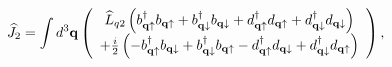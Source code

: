\begin{equation}
\widehat{J}_{2}=\int d^{3}\mathbf{q}\left( 
\begin{array}{c}
\widehat{L}_{q2}\left( b_{\mathbf{q}\uparrow }^{\dagger }b_{\mathbf{q}%
\uparrow }+b_{\mathbf{q}\downarrow }^{\dagger }b_{\mathbf{q}\downarrow }+d_{%
\mathbf{q}\uparrow }^{\dagger }d_{\mathbf{q}\uparrow }+d_{\mathbf{q}%
\downarrow }^{\dagger }d_{\mathbf{q}\downarrow }\right) \\ 
+\frac{i}{2}\left( -b_{\mathbf{q}\uparrow }^{\dagger }b_{\mathbf{q}%
\downarrow }+b_{\mathbf{q}\downarrow }^{\dagger }b_{\mathbf{q}\uparrow }-d_{%
\mathbf{q}\uparrow }^{\dagger }d_{\mathbf{q}\downarrow }+d_{\mathbf{q}%
\downarrow }^{\dagger }d_{\mathbf{q}\uparrow }\right)
\end{array}
\right) ,
\end{equation}

